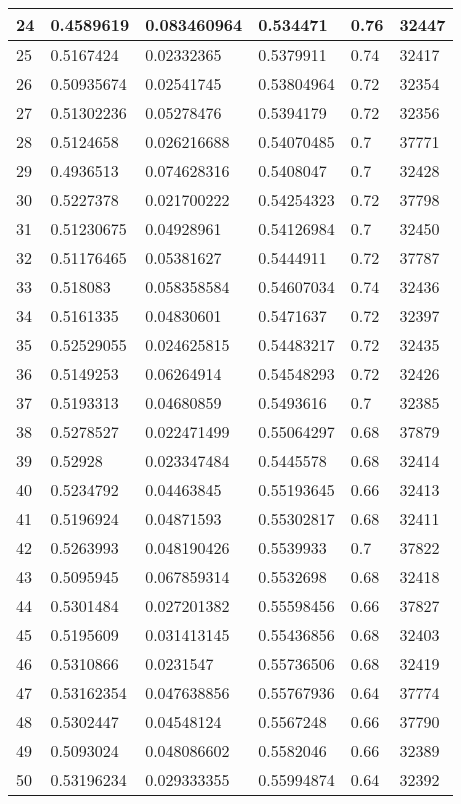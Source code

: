 \begin{longtable}{|l|l|l|l|l|l|}
24 & 0.4589619 & 0.083460964 & 0.534471 & 0.76 & 32447 \\ \hline 
25 & 0.5167424 & 0.02332365 & 0.5379911 & 0.74 & 32417 \\ \hline 
26 & 0.50935674 & 0.02541745 & 0.53804964 & 0.72 & 32354 \\ \hline 
27 & 0.51302236 & 0.05278476 & 0.5394179 & 0.72 & 32356 \\ \hline 
28 & 0.5124658 & 0.026216688 & 0.54070485 & 0.7 & 37771 \\ \hline 
29 & 0.4936513 & 0.074628316 & 0.5408047 & 0.7 & 32428 \\ \hline 
30 & 0.5227378 & 0.021700222 & 0.54254323 & 0.72 & 37798 \\ \hline 
31 & 0.51230675 & 0.04928961 & 0.54126984 & 0.7 & 32450 \\ \hline 
32 & 0.51176465 & 0.05381627 & 0.5444911 & 0.72 & 37787 \\ \hline 
33 & 0.518083 & 0.058358584 & 0.54607034 & 0.74 & 32436 \\ \hline 
34 & 0.5161335 & 0.04830601 & 0.5471637 & 0.72 & 32397 \\ \hline 
35 & 0.52529055 & 0.024625815 & 0.54483217 & 0.72 & 32435 \\ \hline 
36 & 0.5149253 & 0.06264914 & 0.54548293 & 0.72 & 32426 \\ \hline 
37 & 0.5193313 & 0.04680859 & 0.5493616 & 0.7 & 32385 \\ \hline 
38 & 0.5278527 & 0.022471499 & 0.55064297 & 0.68 & 37879 \\ \hline 
39 & 0.52928 & 0.023347484 & 0.5445578 & 0.68 & 32414 \\ \hline 
40 & 0.5234792 & 0.04463845 & 0.55193645 & 0.66 & 32413 \\ \hline 
41 & 0.5196924 & 0.04871593 & 0.55302817 & 0.68 & 32411 \\ \hline 
42 & 0.5263993 & 0.048190426 & 0.5539933 & 0.7 & 37822 \\ \hline 
43 & 0.5095945 & 0.067859314 & 0.5532698 & 0.68 & 32418 \\ \hline 
44 & 0.5301484 & 0.027201382 & 0.55598456 & 0.66 & 37827 \\ \hline 
45 & 0.5195609 & 0.031413145 & 0.55436856 & 0.68 & 32403 \\ \hline 
46 & 0.5310866 & 0.0231547 & 0.55736506 & 0.68 & 32419 \\ \hline 
47 & 0.53162354 & 0.047638856 & 0.55767936 & 0.64 & 37774 \\ \hline 
48 & 0.5302447 & 0.04548124 & 0.5567248 & 0.66 & 37790 \\ \hline 
49 & 0.5093024 & 0.048086602 & 0.5582046 & 0.66 & 32389 \\ \hline 
50 & 0.53196234 & 0.029333355 & 0.55994874 & 0.64 & 32392 \\ \hline 
\end{longtable}